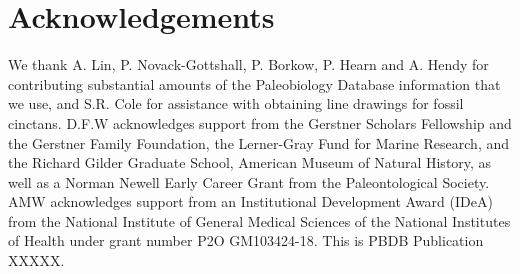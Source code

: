 \documentclass{article}
\begin{document}
\section{Acknowledgements}
We thank A. Lin, P. Novack-Gottshall, P. Borkow, P. Hearn and A. Hendy for contributing substantial amounts of the Paleobiology Database information that we use, and S.R. Cole for assistance with obtaining line drawings for fossil cinctans. D.F.W acknowledges support from the Gerstner Scholars Fellowship and the Gerstner Family Foundation, the Lerner-Gray Fund for Marine Research, and the Richard Gilder Graduate School, American Museum of Natural History, as well as a Norman Newell Early Career Grant from the Paleontological Society. AMW acknowledges  support from an Institutional Development Award (IDeA) from the National Institute of General Medical Sciences of the National Institutes of Health under grant number P2O GM103424-18.  This is PBDB Publication  XXXXX.


 

\end{document}
